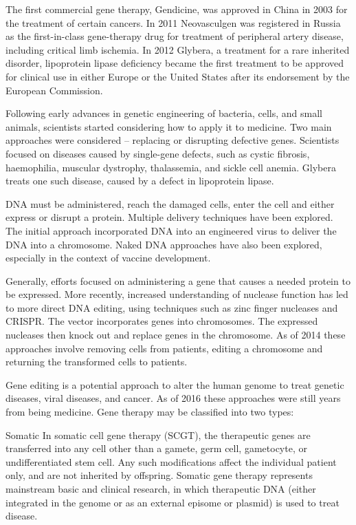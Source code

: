 The first commercial gene therapy, Gendicine, was approved in China in 2003 for the treatment of certain cancers. In 2011 Neovasculgen was registered in Russia as the first-in-class gene-therapy drug for treatment of peripheral artery disease, including critical limb ischemia. In 2012 Glybera, a treatment for a rare inherited disorder, lipoprotein lipase deficiency became the first treatment to be approved for clinical use in either Europe or the United States after its endorsement by the European Commission.

Following early advances in genetic engineering of bacteria, cells, and small animals, scientists started considering how to apply it to medicine. Two main approaches were considered -- replacing or disrupting defective genes. Scientists focused on diseases caused by single-gene defects, such as cystic fibrosis, haemophilia, muscular dystrophy, thalassemia, and sickle cell anemia. Glybera treats one such disease, caused by a defect in lipoprotein lipase.

DNA must be administered, reach the damaged cells, enter the cell and either express or disrupt a protein. Multiple delivery techniques have been explored. The initial approach incorporated DNA into an engineered virus to deliver the DNA into a chromosome. Naked DNA approaches have also been explored, especially in the context of vaccine development.

Generally, efforts focused on administering a gene that causes a needed protein to be expressed. More recently, increased understanding of nuclease function has led to more direct DNA editing, using techniques such as zinc finger nucleases and CRISPR. The vector incorporates genes into chromosomes. The expressed nucleases then knock out and replace genes in the chromosome. As of 2014 these approaches involve removing cells from patients, editing a chromosome and returning the transformed cells to patients.

Gene editing is a potential approach to alter the human genome to treat genetic diseases, viral diseases, and cancer. As of 2016 these approaches were still years from being medicine.
Gene therapy may be classified into two types:

Somatic
In somatic cell gene therapy (SCGT), the therapeutic genes are transferred into any cell other than a gamete, germ cell, gametocyte, or undifferentiated stem cell. Any such modifications affect the individual patient only, and are not inherited by offspring. Somatic gene therapy represents mainstream basic and clinical research, in which therapeutic DNA (either integrated in the genome or as an external episome or plasmid) is used to treat disease.

